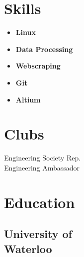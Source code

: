 \documentclass[]{chandan-cv}
\begin{document}
\begin{minipage}[t]{0.27\textwidth}

\section{Skills}
	\begin{itemize}
		\setlength\itemsep{-0.17em}
		\item \textbf{Linux}
		\item \textbf{Data Processing}
		\item \textbf{Webscraping}
		\item \textbf{Git}
		\item \textbf{Altium}
	\end{itemize}
\sectionsep


\section{Clubs}
Engineering Society Rep.\\
Engineering Ambassador
\sectionsep



\section{Education}

\subsection{University of \\
Waterloo}
\sectionsep


%
%

\end{minipage}
\hfill
\end{document}

